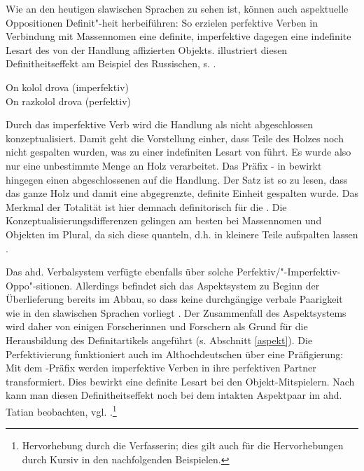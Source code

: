 Wie an den heutigen slawischen Sprachen zu sehen ist, können auch aspektuelle  Oppositionen Definit"-heit  herbeiführen: So erzielen perfektive  Verben in Verbindung mit Massennomen  eine definite, imperfektive  dagegen eine indefinite Lesart  des von der Handlung affizierten Objekts. \textcite[11--14]{Leiss2000} illustriert diesen Definitheitseffekt  am Beispiel des Russischen, s. .

\begin{exe}
	\ex \label{ex:russ-aspekt}   
	\begin{xlist}
		\ex \label{ex:russ-imper} On kolol drova (imperfektiv) \\ 
		\ex \label{ex:russ-per} On razkolol drova (perfektiv) \\ 
		\end{xlist}
\end{exe}
\noindent
Durch das imperfektive  Verb  wird die Handlung als nicht abgeschlossen konzeptualisiert. Damit  geht die Vorstellung einher, dass Teile des Holzes noch nicht gespalten wurden, was zu einer indefiniten Lesart  von   führt. Es wurde also nur eine unbestimmte Menge an Holz verarbeitet. Das Präfix  - in  bewirkt hingegen einen abgeschlossenen   auf die Handlung. Der Satz ist so zu lesen, dass das ganze Holz und damit eine abgegrenzte, definite Einheit gespalten wurde.
Das Merkmal der Totalität ist hier demnach definitorisch für die  \parencite[14]{Leiss2000}. Die Konzeptualisierungsdifferenzen gelingen am besten bei Massennomen  und Objekten  im Plural, da sich diese quanteln, d.h. in kleinere Teile aufspalten lassen \parencite{Heindl2016}. 

Das ahd. Verbalsystem verfügte ebenfalls über solche  Perfektiv/"-Imperfektiv-Oppo"-sitionen. Allerdings befindet sich das Aspektsystem  zu Beginn der Überlieferung bereits im Abbau, so dass keine durchgängige verbale Paarigkeit wie in den slawischen Sprachen vorliegt \parencite[3]{Eroms1997}. Der Zusammenfall des Aspektsystems  wird daher von einigen Forscherinnen und Forschern als Grund für die Herausbildung des Definitartikels  angeführt (s. Abschnitt \ref{aspekt}). Die Perfektivierung  funktioniert auch im Althochdeutschen über eine Präfigierung: Mit dem  -Präfix werden imperfektive  Verben in ihre perfektiven  Partner transformiert. Dies bewirkt eine definite Lesart bei den  Objekt-Mitspielern. Nach \textcite[176--181]{Leiss2000} kann man diesen Definitheitseffekt  noch bei dem intakten Aspektpaar   im ahd. Tatian beobachten, vgl. .\footnote{Hervorhebung durch die Verfasserin; dies gilt auch für die Hervorhebungen durch Kursiv in den nachfolgenden Beispielen.}   

